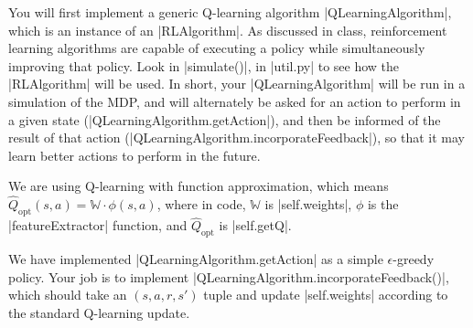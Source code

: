 \item {}
You will first implement a generic Q-learning algorithm |QLearningAlgorithm|,
which is an instance of an |RLAlgorithm|.  As discussed in class, reinforcement
learning algorithms are capable of executing a policy while simultaneously
improving that policy.  Look in |simulate()|, in |util.py| to see how the
|RLAlgorithm| will be used.  In short, your |QLearningAlgorithm| will be run in
a simulation of the MDP, and will alternately be asked for an action to perform
in a given state (|QLearningAlgorithm.getAction|), and then be informed of the
result of that action (|QLearningAlgorithm.incorporateFeedback|), so that it may
learn better actions to perform in the future.

We are using Q-learning with function approximation, which means
$\hat Q_\text{opt}(s, a) = \mathbb W \cdot \phi(s, a)$, where in code,
$\mathbb W$ is |self.weights|, $\phi$ is the |featureExtractor| function, and
$\hat Q_\text{opt}$ is |self.getQ|.

We have implemented |QLearningAlgorithm.getAction| as a simple $\epsilon$-greedy
policy. Your job is to implement |QLearningAlgorithm.incorporateFeedback()|,
which should take an $(s, a, r, s')$ tuple and update |self.weights| according
to the standard Q-learning update.
